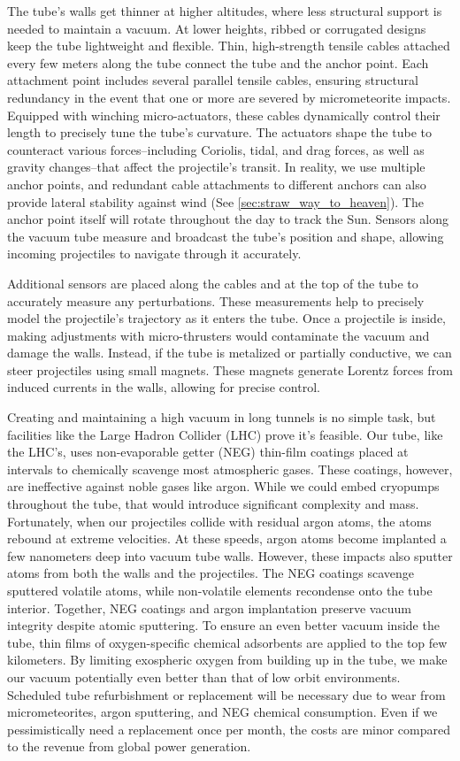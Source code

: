 \documentclass{article}
\begin{document}
The tube's walls get thinner at higher altitudes, where less structural support is needed to maintain a vacuum.  At lower heights, ribbed or corrugated designs  keep the tube lightweight and flexible. Thin, high-strength tensile cables attached every few meters along the tube connect the tube and the anchor point.  Each attachment point includes several parallel tensile cables, ensuring structural redundancy in the event that one or more are severed by micrometeorite impacts.   Equipped with winching micro-actuators, these cables dynamically control their length to precisely tune the tube's curvature. The actuators shape the tube to counteract various forces--including Coriolis, tidal, and drag forces, as well as gravity changes--that affect the projectile's transit. In reality, we use multiple anchor points, and redundant cable attachments to different anchors can also provide lateral stability against wind (See \autoref{sec:straw_way_to_heaven}). The anchor point itself will rotate throughout the day to track the Sun.  Sensors along the vacuum tube measure and broadcast the tube's position and shape, allowing incoming projectiles to navigate through it accurately.

Additional sensors are placed along the cables and at the top of the tube to accurately measure any perturbations. These measurements help to precisely model the projectile's trajectory as it enters the tube. Once a projectile is inside, making adjustments with micro-thrusters would contaminate the vacuum and damage the walls. Instead, if the tube is metalized or partially conductive, we can steer projectiles using small magnets. These magnets generate Lorentz forces from induced currents in the walls, allowing for precise control.

Creating and maintaining a high vacuum in long tunnels is no simple task, but facilities like the Large Hadron Collider (LHC) prove it's feasible. Our tube, like the LHC's, uses non-evaporable getter (NEG) \cite{neg_coatings} thin-film coatings placed at intervals to chemically scavenge most atmospheric gases. These coatings, however, are ineffective against noble gases like argon. While we could embed cryopumps throughout the tube, that would introduce significant complexity and mass. Fortunately, when our projectiles collide with residual argon atoms, the atoms rebound at extreme velocities.  At these speeds, argon atoms become implanted a few nanometers deep into vacuum tube walls.  However, these impacts also sputter atoms from both the walls and the projectiles. The NEG coatings scavenge sputtered volatile atoms, while non-volatile elements recondense onto the tube interior.  Together, NEG coatings and argon implantation preserve vacuum integrity despite atomic sputtering. To ensure an even better vacuum inside the tube, thin films of oxygen-specific chemical adsorbents  are applied to the top few kilometers. By limiting exospheric oxygen from building up in the tube, we make our vacuum potentially even better than that of low orbit environments.  Scheduled tube refurbishment or replacement will be necessary due to wear from micrometeorites, argon sputtering, and NEG chemical consumption. Even if we pessimistically need a replacement once per month, the costs are minor compared to the revenue from global power generation.
\end{document}
